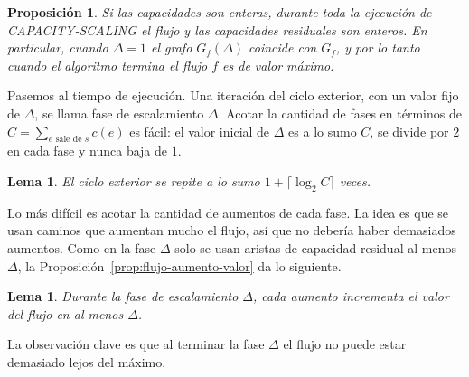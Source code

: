\documentclass[12pt, spanish, oneside, openany]{book}
\newcommand{\alg}[1]{#1}
\theoremstyle{uprightplain}
\newtheorem{lema}[teorema]{Lema}
\newtheorem{proposicion}[teorema]{Proposición}
\theoremstyle{definition}
\theoremstyle{remark}
\theoremstyle{definition}
\begin{document}
\begin{proposicion}
\label{prop:flujo-esc-correcto}
Si las capacidades son enteras, durante toda la ejecución de \alg{CAPACITY-SCALING} el flujo y las capacidades residuales son enteros. En particular, cuando $\Delta=1$ el grafo $G_f(\Delta)$ coincide con $G_f$, y por lo tanto cuando el algoritmo termina el flujo $f$ es de valor máximo.
\end{proposicion}

Pasemos al tiempo de ejecución. Una iteración del ciclo exterior, con un valor fijo de $\Delta$, se llama fase de escalamiento $\Delta$. Acotar la cantidad de fases en términos de $C=\sum_{e\text{ sale de }s}c(e)$ es fácil: el valor inicial de $\Delta$ es a lo sumo $C$, se divide por $2$ en cada fase y nunca baja de $1$.

\begin{lema}
\label{lema:flujo-esc-fases}
El ciclo exterior se repite a lo sumo $1+\lceil\log_2 C\rceil$ veces.
\end{lema}

Lo más difícil es acotar la cantidad de aumentos de cada fase. La idea es que se usan caminos que aumentan mucho el flujo, así que no debería haber demasiados aumentos. Como en la fase $\Delta$ solo se usan aristas de capacidad residual al menos $\Delta$, la Proposición~\ref{prop:flujo-aumento-valor} da lo siguiente.

\begin{lema}
\label{lema:flujo-esc-aumento}
Durante la fase de escalamiento $\Delta$, cada aumento incrementa el valor del flujo en al menos $\Delta$.
\end{lema}

La observación clave es que al terminar la fase $\Delta$ el flujo no puede estar demasiado lejos del máximo.
\end{document}
